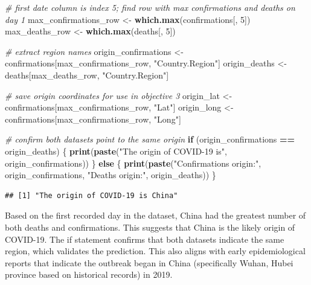 \documentclass[
]{article}
\newenvironment{Shaded}{\begin{snugshade}}{\end{snugshade}}
\newcommand{\CommentTok}[1]{\textcolor[rgb]{0.56,0.35,0.01}{\textit{#1}}}
\newcommand{\ControlFlowTok}[1]{\textcolor[rgb]{0.13,0.29,0.53}{\textbf{#1}}}
\newcommand{\DecValTok}[1]{\textcolor[rgb]{0.00,0.00,0.81}{#1}}
\newcommand{\FunctionTok}[1]{\textcolor[rgb]{0.13,0.29,0.53}{\textbf{#1}}}
\newcommand{\NormalTok}[1]{#1}
\newcommand{\OtherTok}[1]{\textcolor[rgb]{0.56,0.35,0.01}{#1}}
\newcommand{\SpecialCharTok}[1]{\textcolor[rgb]{0.81,0.36,0.00}{\textbf{#1}}}
\newcommand{\StringTok}[1]{\textcolor[rgb]{0.31,0.60,0.02}{#1}}
\begin{document}
\begin{Shaded}
\begin{Highlighting}[]
\CommentTok{\# first date column is index 5; find row with max confirmations and deaths on day 1}
\NormalTok{max\_confirmations\_row }\OtherTok{\textless{}{-}} \FunctionTok{which.max}\NormalTok{(confirmations[, }\DecValTok{5}\NormalTok{])}
\NormalTok{max\_deaths\_row }\OtherTok{\textless{}{-}} \FunctionTok{which.max}\NormalTok{(deaths[, }\DecValTok{5}\NormalTok{])}

\CommentTok{\# extract region names}
\NormalTok{origin\_confirmations }\OtherTok{\textless{}{-}}\NormalTok{ confirmations[max\_confirmations\_row, }\StringTok{"Country.Region"}\NormalTok{]}
\NormalTok{origin\_deaths }\OtherTok{\textless{}{-}}\NormalTok{ deaths[max\_deaths\_row, }\StringTok{"Country.Region"}\NormalTok{]}

\CommentTok{\# save origin coordinates for use in objective 3}
\NormalTok{origin\_lat }\OtherTok{\textless{}{-}}\NormalTok{ confirmations[max\_confirmations\_row, }\StringTok{"Lat"}\NormalTok{]}
\NormalTok{origin\_long }\OtherTok{\textless{}{-}}\NormalTok{ confirmations[max\_confirmations\_row, }\StringTok{"Long"}\NormalTok{]}

\CommentTok{\# confirm both datasets point to the same origin}
\ControlFlowTok{if}\NormalTok{ (origin\_confirmations }\SpecialCharTok{==}\NormalTok{ origin\_deaths) \{}
  \FunctionTok{print}\NormalTok{(}\FunctionTok{paste}\NormalTok{(}\StringTok{"The origin of COVID{-}19 is"}\NormalTok{, origin\_confirmations))}
\NormalTok{\} }\ControlFlowTok{else}\NormalTok{ \{}
  \FunctionTok{print}\NormalTok{(}\FunctionTok{paste}\NormalTok{(}\StringTok{"Confirmations origin:"}\NormalTok{, origin\_confirmations,}
              \StringTok{"Deaths origin:"}\NormalTok{, origin\_deaths))}
\NormalTok{\}}
\end{Highlighting}
\end{Shaded}

\begin{verbatim}
## [1] "The origin of COVID-19 is China"
\end{verbatim}

Based on the first recorded day in the dataset, China had the greatest
number of both deaths and confirmations. This suggests that China is the
likely origin of COVID-19. The if statement confirms that both datasets
indicate the same region, which validates the prediction. This also
aligns with early epidemiological reports that indicate the outbreak
began in China (specifically Wuhan, Hubei province based on historical
records) in 2019.
\end{document}
